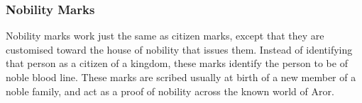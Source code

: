\subsubsection{Nobility Marks}
\label{sec:Nobility Mark}

Nobility marks work just the same as citizen marks, except that they are
customised toward the house of nobility that issues them. Instead of
identifying that person as a citizen of a kingdom, these marks identify the
person to be of noble blood line. These marks are scribed usually at birth of
a new member of a noble family, and act as a proof of nobility across the
known world of Aror.
